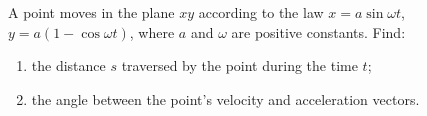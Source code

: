 
\item A point moves in the plane $xy$ according to the law $x = a \sin \omega t$, $y = a(1 - \cos \omega t)$, where $a$ and $\omega$ are positive constants. Find:
    \begin{enumerate}
        \item the distance $s$ traversed by the point during the time $t$;
        \item the angle between the point's velocity and acceleration vectors.
    \end{enumerate}
